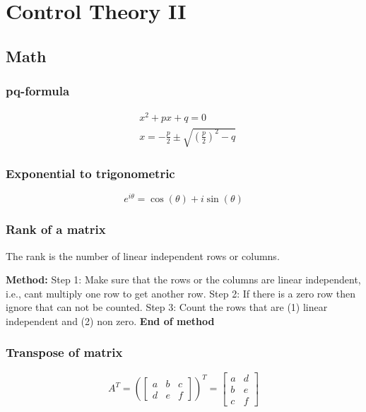 \chapter{Control Theory II}

\newcommand{\ctii}{image/chap27_ctii}


\begin{multicols}{2}
\section{Math}
\subsection{pq-formula}
\begin{align*}
    &x^2 + px +q = 0 \\
    &x= -\frac{p}{2} \pm \sqrt{\left(\frac{p}{2}\right)^2 - q}
\end{align*}


\subsection{Exponential to trigonometric}
\begin{equation*}
   e^{i\theta} = \cos(\theta) + i\sin(\theta)
\end{equation*}


\subsection{Rank of a matrix}
The rank is the number of linear independent rows or columns.

\textbf{Method:}\newline
Step 1: Make sure that the rows or the columns are linear independent, i.e., cant multiply one row to get another row. \newline
Step 2: If there is a zero row then ignore that can not be counted. \newline
Step 3: Count the rows that are (1) linear independent and (2) non zero. \newline
\textbf{End of method}


\subsection{Transpose of matrix}
\begin{equation*}
    A^T = \left(\begin{bmatrix} a & b & c \\ d & e & f \end{bmatrix}\right)^T
    = \begin{bmatrix} a & d \\ b & e \\ c & f \end{bmatrix}
\end{equation*}



\end{multicols}
